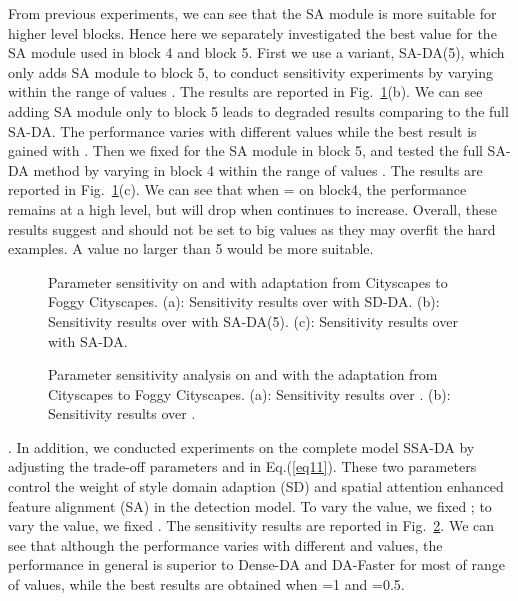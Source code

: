 \documentclass[runningheads]{llncs}
\begin{document}
From previous experiments, we can see that the SA module is more suitable for higher level blocks.
Hence here we separately investigated the best  value for the SA module used in block 4 and block 5.
First we use a variant, SA-DA(5), which only adds SA module to block 5, to conduct sensitivity experiments
by varying  within the range of values .
The results are reported in Fig.~\ref{fig:three}(b).
We can see adding SA module only to block 5 leads to degraded results comparing to the full SA-DA.
The performance varies with different  values while the best result is gained with .
Then we fixed  for the SA module in block 5, 
and tested the full SA-DA method 
by varying  in block 4 within the range of values .
The results are reported in Fig.~\ref{fig:three}(c). 
We can see that when  =  on block4, 
the performance remains at a high level, but will drop when  continues to increase.
Overall, these results suggest  and  should not be set to big values
as they may overfit the hard examples. A value no larger than 5 would be more suitable.
\\


\begin{figure}[t]
\centering
{}
\quad
{}
\quad
{}
\caption{Parameter sensitivity on  and  with adaptation from Cityscapes to Foggy Cityscapes. 
{(a)}: Sensitivity results over  with SD-DA. 
{(b)}: Sensitivity results over  with SA-DA(5).
{(c)}: Sensitivity results over  with SA-DA.}
\label{fig:three}
\end{figure}
\begin{figure}[t]
\centering
{}
\quad
{}
   \caption{Parameter sensitivity analysis on  and  with the adaptation from Cityscapes to Foggy Cityscapes. 
	{(a)}: Sensitivity results over . {(b)}: Sensitivity results over .}
\label{fig:four}
\end{figure}
. 
In addition, we conducted experiments on the complete model SSA-DA by adjusting the trade-off parameters  and  in Eq.(\ref{eq11}). 
These two parameters control the weight of style domain adaption (SD) and spatial attention enhanced feature alignment (SA) 
in the detection model. 
To vary the  value, we fixed ; to vary the  value, we fixed .
The sensitivity results are reported in Fig.~\ref{fig:four}.
We can see that although the performance varies with different  and  values,
the performance in general is superior to Dense-DA and DA-Faster for most of range of values,
while the best results are obtained when =1 and =0.5.
\end{document}
